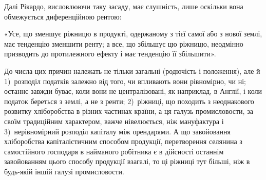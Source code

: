 Далі Рікардо, висловлюючи таку засаду, має слушність, лише оскільки вона
обмежується диференційною рентою:

«Усе, що зменшує ріжницю в продукті, одержаному з тієї самої або з
нової землі, має тенденцію зменшити ренту; а все, що збільшує цю ріжницю,
неодмінно призводить до протилежного ефекту і має тенденцію її збільшити».

До числа цих причин належать не тільки загальні (родючість і положення),
але й 1)~розподіл податків залежно від того, чи впливають вони
рівномірно, чи ні; останнє завжди буває, коли вони не централізовані, як наприклад,
в Англії, і коли податок береться з землі, а не з ренти; 2)~ріжниці,
що походить з неоднакового розвитку хліборобства в різних частинах країни,
а ця галузь промисловости, за своїм традиційним характером, важче нівелюється,
ніж мануфактура і 3)~нерівномірний розподіл капіталу між орендарями.
А що завойовання хліборобства капіталістичним способом продукції, перетворення
селянина з самостійного господаря в найманого робітника є в дійсності останнім
завойованням цього способу продукції взагалі, то ці ріжниці тут більші,
ніж в будь-якій іншій галузі промисловости.
